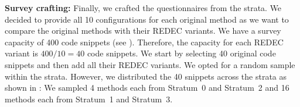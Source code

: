 \documentclass[%
class=scrreprt,
chapterprefix=false,%
open=right,%
twoside=false,%
paper=a4,%
logofile={Logo\_zentral\_farbig\_EN.png},%
thesistype=master,%
UKenglish,%
]{se2thesis}
\theoremstyle{definition}
\newcommand{\rdh}{REDEC\xspace}
\begin{document}
		
	\textbf{Survey crafting:} Finally, we crafted the questionnaires from the strata. We decided to provide all 10 configurations for each original method as we want to compare the original methods with their \rdh variants. We have a survey capacity of 400 code snippets (see ). Therefore, the capacity for each \rdh variant is $400/10 = 40$ code snippets. We start by selecting 40 original code snippets and then add all their \rdh variants.
	We opted for a random sample within the strata. However, we distributed the 40 snippets across the strata as shown in :
	We sampled 4 methods each from Stratum~0 and Stratum~2 and 16 methods each from Stratum~1 and Stratum~3.
	
%
	
\end{document}
